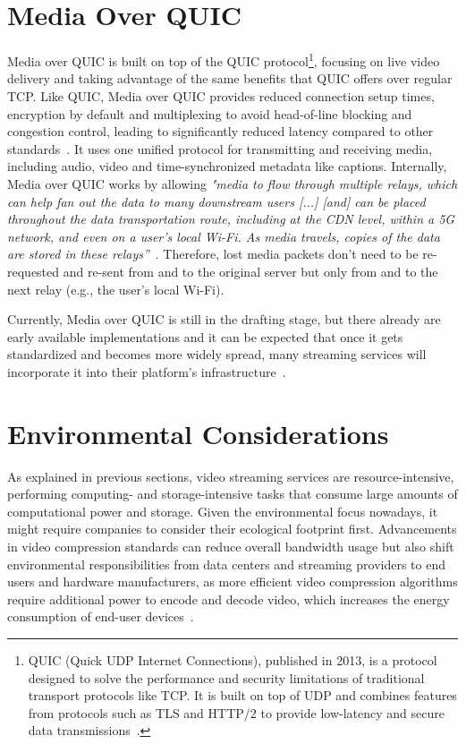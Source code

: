 \section{Media Over QUIC}

Media over QUIC is built on top of the QUIC protocol\footnote{QUIC (Quick UDP Internet Connections), published in 2013, is a protocol designed to solve the performance and security limitations of traditional transport protocols like TCP. It is built on top of UDP and combines features from protocols such as TLS and HTTP/2 to provide low-latency and secure data transmissions~\parencite{quic}.}, focusing on live video delivery and taking advantage of the same benefits that QUIC offers over regular TCP. Like QUIC, Media over QUIC provides reduced connection setup times, encryption by default and multiplexing to avoid head-of-line blocking and congestion control, leading to significantly reduced latency compared to other standards~\parencite{moq_ieft}. It uses one unified protocol for transmitting and receiving media, including audio, video and time-synchronized metadata like captions. Internally, Media over QUIC works by allowing \textit{"media to flow through multiple relays, which can help fan out the data to many downstream users [...] [and] can be placed throughout the data transportation route, including at the \ac{CDN} level, within a 5G network, and even on a user’s local Wi-Fi. As media travels, copies of the data are stored in these relays”}~\parencite{moq_ieft}. Therefore, lost media packets don’t need to be re-requested and re-sent from and to the original server but only from and to the next relay (e.g., the user’s local Wi-Fi).

Currently, Media over QUIC is still in the drafting stage, but there already are early available implementations and it can be expected that once it gets standardized and becomes more widely spread, many streaming services will incorporate it into their platform’s infrastructure~\parencite{moq_project}.

\section{Environmental Considerations}

As explained in previous sections, video streaming services are resource-intensive, performing computing- and storage-intensive tasks that consume large amounts of computational power and storage.
Given the environmental focus nowadays, it might require companies to consider their ecological footprint first. Advancements in video compression standards can reduce overall bandwidth usage but also shift environmental responsibilities from data centers and streaming providers to end users and hardware manufacturers, as more efficient video compression algorithms require additional power to encode and decode video, which increases the energy consumption of end-user devices~\parencite{save_environment}.